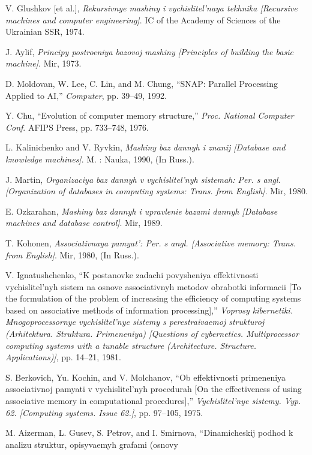 \documentclass{article}
\begin{document}
{\begin{multicols}{2}
{\begin{thebibliography}{65}
    \item V. Glushkov [et al.], \textit{Rekursivnye mashiny i vychislitel’naya
tekhnika [Recursive machines and computer engineering]}. IC of
the Academy of Sciences of the Ukrainian SSR, 1974.
    \item J. Aylif, \textit{Principy postroeniya bazovoj mashiny [Principles of
building the basic machine]}. Mir, 1973.
    \item  D. Moldovan, W. Lee, C. Lin, and M. Chung, “SNAP: Parallel
Processing Applied to AI,” \textit{Computer}, pp. 39–49, 1992.
    \item Y. Chu, “Evolution of computer memory structure,” \textit{Proc. National
Computer Conf}. AFIPS Press, pp. 733–748, 1976.
    \item L. Kalinichenko and V. Ryvkin, \textit{Mashiny baz dannyh i znanij
[Database and knowledge machines]}. M. : Nauka, 1990, (In
Russ.).
    \item J. Martin, \textit{Organizaciya baz dannyh v vychislitel’nyh sistemah:
Per. s angl. [Organization of databases in computing systems:
Trans. from English]}. Mir, 1980.
    \item E. Ozkarahan, \textit{Mashiny baz dannyh i upravlenie bazami dannyh
[Database machines and database control]}. Mir, 1989.
    \item T. Kohonen, \textit{Associativnaya pamyat’: Per. s angl. [Associative
memory: Trans. from English]}. Mir, 1980, (In Russ.).
    \item V. Ignatushchenko, “K postanovke zadachi povysheniya effektivnosti vychislitel’nyh sistem na osnove associativnyh metodov
obrabotki informacii [To the formulation of the problem of
increasing the efficiency of computing systems based on associative methods of information processing],” \textit{Voprosy kibernetiki.
Mnogoprocessornye vychislitel’nye sistemy s perestraivaemoj
strukturoj (Arhitektura. Struktura. Primeneniya) [Questions of
cybernetics. Multiprocessor computing systems with a tunable
structure (Architecture. Structure. Applications)]}, pp. 14–21, 1981.
    \item S. Berkovich, Yu. Kochin, and V. Molchanov, “Ob effektivnosti
primeneniya associativnoj pamyati v vychislitel’nyh procedurah
[On the effectiveness of using associative memory in computational
procedures],” \textit{Vychislitel’nye sistemy. Vyp. 62. [Computing systems.
Issue 62.]}, pp. 97–105, 1975.
    \item M. Aizerman, L. Gusev, S. Petrov, and I. Smirnova, “Dinamicheskij podhod k analizu struktur, opisyvaemyh grafami (osnovy

\end{thebibliography}}
\end{multicols}}
\end{document}
